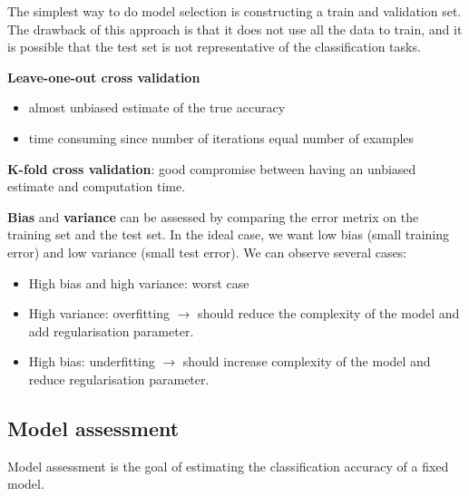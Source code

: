 The simplest way to do model selection is constructing a train and validation set. The drawback of this approach is that it does not use all the data to train, and it is possible that the test set is not representative of the classification tasks.

\textbf{Leave-one-out cross validation}
\begin{itemize}
	\item almost unbiased estimate of the true accuracy
	\item time consuming since number of iterations equal number of examples
\end{itemize}

\textbf{K-fold cross validation}: good compromise between having an unbiased estimate and computation time.

\textbf{Bias} and \textbf{variance} can be assessed by comparing the error metrix on the training set and the test set. In the ideal case, we want low bias (small training error) and low variance (small test error). We can observe several cases:
\begin{itemize}
	\item High bias and high variance: worst case
	\item High variance: overfitting $\rightarrow$ should reduce the complexity of the model and add regularisation parameter.
	\item High bias: underfitting $\rightarrow$ should increase complexity of the model and reduce regularisation parameter.
\end{itemize}

\subsection{Model assessment}
Model assessment is the goal of estimating the classification accuracy of a fixed model.

